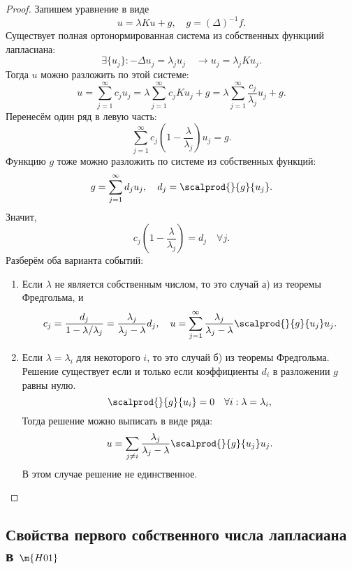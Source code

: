 \begin{proof} Запишем уравнение в виде
$$ u = \lambda K u + g, \quad g = (\Delta )^{-1} f.$$
Существует полная ортонормированная система из собственных функциий лапласиана:
$$ \exists \{ u_j \} : - \Delta u_j = \lambda_j u_j \quad \rightarrow u_j = \lambda_j K u_j.$$
Тогда $u$ можно разложить по этой системе:
$$ u = \sum_{j=1}^\infty c_j u_j = \lambda \sum_{j=1}^\infty c_j K u_j + g = \lambda \sum_{j=1}^\infty \frac{c_j}{\lambda_j} u_j + g.$$
Перенесём один ряд в левую часть:
$$ \sum_{j=1}^\infty c_j \left( 1 - \frac {\lambda} {\lambda_j} \right) u_j = g.$$
Функцию $g$ тоже можно разложить по системе из собственных функций:
$$g = \sum_{j=1}^\infty d_j u_j, \quad d_j = \scalprod{}{g}{u_j}.$$
Значит,
$$ c_j \left( 1 - \frac{\lambda}{\lambda_j} \right) = d_j \quad \forall j.$$
Разберём оба варианта событий:
\begin{enumerate}
\item Если $\lambda$ не является собственным числом, то это случай а) из теоремы Фредгольма, и
$$ c_j = \frac {d_j}{1- \lambda/\lambda_j} = \frac {\lambda_j}{\lambda_j - \lambda} d_j, \quad u = \sum_{j=1}^\infty \frac{\lambda_j}{\lambda_j - \lambda} \scalprod{}{g}{u_j} u_j.$$
\item Если $\lambda = \lambda_i$ для некоторого $i$, то это случай б) из теоремы Фредгольма. Решение существует если и только если коэффициенты $d_i$ в разложении $g$ равны нулю.
$$ \scalprod{}{g}{u_i}=0 \quad \forall i: \lambda = \lambda_i,$$
Тогда решение можно выписать в виде ряда:
$$ u = \sum_{j \neq i} \frac {\lambda_j} {\lambda_j - \lambda} \scalprod{}{g}{u_j} u_j.$$
В этом случае решение не единственное.
\end{enumerate}

\end{proof}



\subsection{Свойства первого собственного числа лапласиана в $\m{H01}$}

